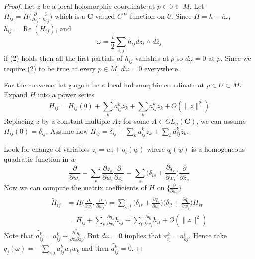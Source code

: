 \documentclass[
11pt, %
letterpaper， %
oneside, %
headinclude,footinclude, %
BCOR5mm, %
]{scrartcl}
\newcommand{\C}{{\mathbf{C}}}
\newcommand{\re}{\operatorname{Re}}
\begin{document}
\begin{proof}
	Let $\underline{z}$ be a local holomorphic coordinate at $p\in U\subset  M$. Let $H_{ij}=H\big(\frac{\partial}{\partial z_i},\frac{\partial}{\partial z_j}\big)$ which is a $\C$-valued $C^{\infty}$ function on $U$. Since $H=h-i\omega$, $h_{ij}=\re(H_{ij})$, and 
	\begin{equation*}
	\omega= \frac{i}{2}\sum_{i,j} h_{ij} dz_i\wedge d\overline{z}_j
	\end{equation*}
	if (2) holds then all the first partials of $h_{ij}$ vanishes at $p$ so $d\omega=0$ at $p$. Since we require (2) to be true at every $p\in M$, $d\omega=0$ everywhere.
	
	For the converse, let $\underline{z}$ again be a local holomorphic coordinate at $p\in U\subset  M$. Expand $H$ into a power series
	\begin{equation*}
	H_{ij}=H_{ij}(0)+\sum_k a_{ij}^k z_k +\sum_k \overline{a}_{ij}^k \overline{z}_k + O(\|z\|^2 )
	\end{equation*}
	Replacing  $\underline{z}$ by a constant multiple $A \underline{z}$ for some $A\in GL_n(\C)$, we can assume $H_{ij}(0)=\delta_{ij}$. Assume now $H_{ij}=\delta_{ij}+\sum_k a_{ij}^k z_k +\sum_k \overline{a}_{ij}^k \overline{z}_k$.
	
	Look for change of variables $z_i=w_i+q_i(\underline{w})$ where $q_i(\underline{w})$ is a homogeneous quadratic function in $\underline{w}$
	\begin{equation*}
	\frac{\partial}{\partial w_i}=\sum_s \frac{\partial z_s}{\partial w_i}\frac{\partial}{\partial z_s}=\sum_s \big(\delta_{is}+\frac{\partial q_s}{\partial w_i}\big)\frac{\partial}{\partial z_s}
	\end{equation*}
	Now we can compute the matrix coefficients of $H$  on $\{\frac{\partial}{\partial w_i} \}$
	\begin{align*}
	\tilde{H}_{ij}&=H\big(\frac{\partial}{\partial w_i},\frac{\partial}{\partial w_j}\big)=\sum_{s,t}\big(\delta_{is}+\frac{\partial q_s}{\partial w_i}\big)\big(\delta_{jt}+\frac{\overline{\partial q_t}}{\partial w_j}\big)H_{st}\\
	&=H_{ij}+\sum_s \frac{\partial q_s}{\partial w_i} h_{sj}+ \sum_t \frac{\overline{\partial q_t}}{\partial w_j}h_{it}+ O(\|z\|^2 )
	\end{align*}
	Note that $\widetilde{a^k_{ij}}=a^{k}_{ij}+\frac{\partial^2 q_i}{\partial z_i \partial z_k}$. But $d\omega=0$ implies that $a^{k}_{ij}=a^i_{kj}$. Hence take $q_j(\omega)=-\sum_{i,j} a^{k}_{ij}w_iw_k$ and then $\widetilde{a^k_{ij}}=0$.
\end{proof}
\end{document}
